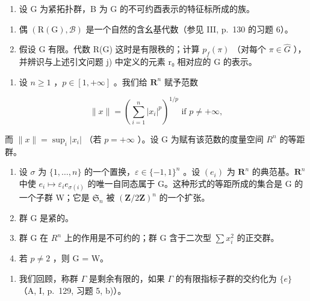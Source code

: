 \exercisesection{}

\begin{enumerate}
\def\labelenumi{\arabic{enumi})}
\tightlist
\item
  设 G 为紧拓扑群，B 为 G 的不可约酉表示的特征标所成的族。
\end{enumerate}

\begin{enumerate}
\def\labelenumi{\alph{enumi})}
\item
  偶 \((\mathrm{R}(\mathrm{G}),\mathcal{B})\) 是一个自然的含幺基代数（参见 III, p.~130 的习题 6）。
\item
  假设 G 有限。代数 R(G) 这时是有限秩的；计算 \(p_f(\pi)\) （对每个 \(\pi \in \widehat{G}\) ），并辨识与上述引文问题 j) 中定义的元素 r₀ 相对应的 G 的表示。
\end{enumerate}

\begin{enumerate}
\def\labelenumi{\arabic{enumi})}
\setcounter{enumi}{1}
\tightlist
\item
  设 \(n \geqslant 1\) ，\(p \in [1, +\infty]\) 。我们给 \(\mathbf{R}^n\) 赋予范数
\end{enumerate}

\[
\| x \| = \left(\sum_ {i = 1} ^ {n} | x _ {i} | ^ {p}\right) ^ {1 / p} \text {   if   } p \neq + \infty ,
\]

而 \(\|x\| = \sup_{i}|x_{i}|\) （若 \(p = +\infty\) ）。设 G 为赋有该范数的度量空间 \(R^{n}\) 的等距群。

\begin{enumerate}
\def\labelenumi{\alph{enumi})}
\item
  设 \(\sigma\) 为 \(\{1,\ldots,n\}\) 的一个置换，\(\varepsilon\in\{-1,1\}^{n}\) 。设 \((e_{i})\) 为 \(\mathbf{R}^{n}\) 的典范基。\(\mathbf{R}^{n}\) 中使 \(e_{i}\mapsto\varepsilon_{i}e_{\sigma(i)}\) 的唯一自同态属于 G。这种形式的等距所成的集合是 G 的一个子群 W；它是 \(\mathfrak{S}_{n}\) 被 \((\mathbf{Z}/2\mathbf{Z})^{n}\) 的一个扩张。
\item
  群 G 是紧的。
\item
  群 G 在 \(R^{n}\) 上的作用是不可约的；群 G 含于二次型 \(\sum x_{i}^{2}\) 的正交群。
\item
  若 \(p \neq 2\) ，则 G = W。
\end{enumerate}

\begin{enumerate}
\def\labelenumi{\arabic{enumi})}
\setcounter{enumi}{2}
\tightlist
\item
  我们回顾，称群 \(\Gamma\) 是剩余有限的，如果 \(\Gamma\) 的有限指标子群的交约化为 \(\{e\}\) （A, I, p.~129, 习题 5, b)）。
\end{enumerate}

